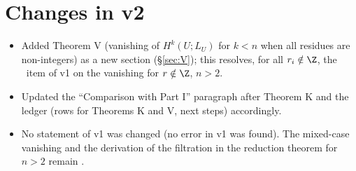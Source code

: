 \section*{Changes in v2}
\begin{itemize}
\item Added Theorem V (vanishing of $H^k(U;L_U)$ for $k<n$ when all residues are non-integers) as a new section (\S\ref{sec:V}); this resolves, for all $r_i\notin\Z$, the \tQ\ item of v1 on the vanishing for $r\notin\Z$, $n>2$.
\item Updated the ``Comparison with Part I'' paragraph after Theorem K and the ledger (rows for Theorems K and V, next steps) accordingly.
\item No statement of v1 was changed (no error in v1 was found). The mixed-case vanishing and the derivation of the filtration in the reduction theorem for $n>2$ remain \tQ.
\end{itemize}
